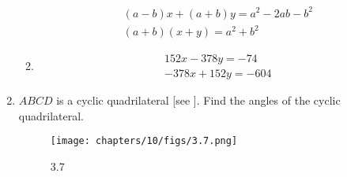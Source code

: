 \begin{enumerate}
\begin{enumerate}
\begin{align}
(a-b)x+(a+b)y=a^2-2ab-b^2\\ (a+b)(x+y)=a^2+b^2
\end{align}
\item
\begin{align}
152x-378y=-74\\ -378x+152y=-604
\end{align}
\end{enumerate}
\item $ABCD$ is a cyclic quadrilateral [see ]. Find the angles of the cyclic quadrilateral.
\begin{figure}[ht]
\centering
\texttt{[image: chapters/10/figs/3.7.png]}
\caption{3.7}
  \label{fig:3.7}
\end{figure}
\end{enumerate}

